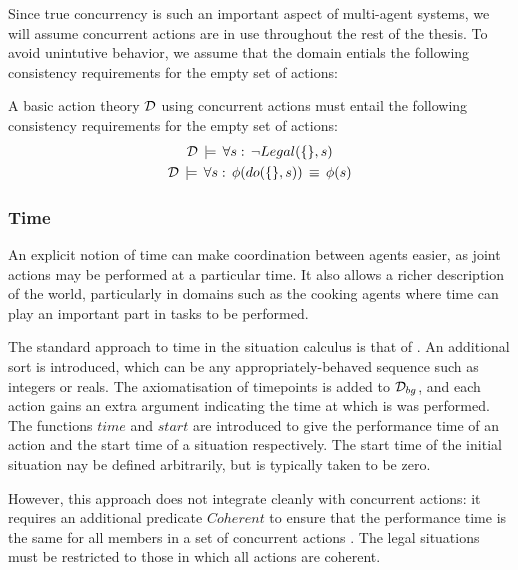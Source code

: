 Since true concurrency is such an important aspect of multi-agent
systems, we will assume concurrent actions are in use throughout the
rest of the thesis. To avoid unintutive behavior, we assume that the
domain entials the following consistency requirements for the empty
set of actions:

\begin{defnL}
 A basic action theory $\mathcal{D}$ using
concurrent actions must entail the following consistency requirements
for the empty set of actions:\begin{gather*}
\mathcal{D}\,\models\,\forall s:\,\neg Legal(\{\},s)\\
\mathcal{D}\,\models\,\forall s:\,\phi(do(\{\},s))\,\equiv\,\phi(s)\end{gather*}

\end{defnL}

\subsubsection{Time}

\label{sec:Background:Time}

An explicit notion of time can make coordination between agents easier,
as joint actions may be performed at a particular time. It also allows
a richer description of the world, particularly in domains such as
the cooking agents where time can play an important part in tasks
to be performed.

The standard approach to time in the situation calculus is that of
\citep{pinto94temporal,pinto95reasoning_time,reiter96sc_nat_conc}.
An additional sort  is introduced, which can be any
appropriately-behaved sequence such as integers or reals. The axiomatisation
of timepoints is added to $\mathcal{D}_{bg}$, and each action gains an extra
argument indicating the time at which is was performed. The functions
$time$ and $start$ are introduced to give the performance time of
an action and the start time of a situation respectively. The start
time of the initial situation nay be defined arbitrarily, but is typically
taken to be zero.

However, this approach does not integrate cleanly with concurrent
actions: it requires an additional predicate $Coherent$ to ensure
that the performance time is the same for all members in a set of
concurrent actions \citep{reiter96sc_nat_conc}. The legal situations
must be restricted to those in which all actions are coherent.


